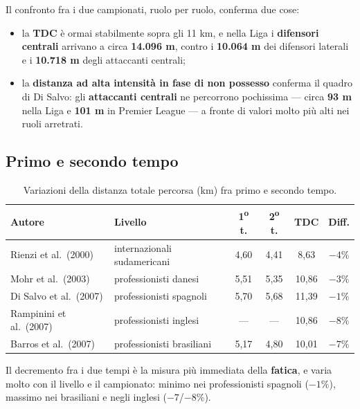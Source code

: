 Il confronto fra i due campionati, ruolo per ruolo, conferma due cose:
\begin{itemize}
  \item la \textbf{TDC} è ormai stabilmente sopra gli 11 km, e nella Liga i \textbf{difensori
    centrali} arrivano a circa \textbf{14.096 m}, contro i \textbf{10.064 m} dei difensori
    laterali e i \textbf{10.718 m} degli attaccanti centrali;
  \item la \textbf{distanza ad alta intensità in fase di non possesso} conferma il quadro di Di
    Salvo: gli \textbf{attaccanti centrali} ne percorrono pochissima --- circa \textbf{93 m} nella
    Liga e \textbf{101 m} in Premier League --- a fronte di valori molto più alti nei ruoli
    arretrati.
\end{itemize}

\subsection{Primo e secondo tempo}

\begin{table}[htbp]
  \centering
  \small
  \renewcommand{\arraystretch}{1.3}
  \begin{tabularx}{\textwidth}{|X|X|c|c|c|c|}
    \hline
    \textbf{Autore} & \textbf{Livello} & \textbf{1\textsuperscript{o} t.} &
      \textbf{2\textsuperscript{o} t.} & \textbf{TDC} & \textbf{Diff.} \\
    \hline
    Rienzi et al.\ (2000) & internazionali sudamericani & 4,60 & 4,41 & 8,63 & $-4\%$ \\
    \hline
    Mohr et al.\ (2003) & professionisti danesi & 5,51 & 5,35 & 10,86 & $-3\%$ \\
    \hline
    Di Salvo et al.\ (2007) & professionisti spagnoli & 5,70 & 5,68 & 11,39 & $-1\%$ \\
    \hline
    Rampinini et al.\ (2007) & professionisti inglesi & --- & --- & 10,86 & $-8\%$ \\
    \hline
    Barros et al.\ (2007) & professionisti brasiliani & 5,17 & 4,80 & 10,01 & $-7\%$ \\
    \hline
  \end{tabularx}
  \caption*{Variazioni della distanza totale percorsa (km) fra primo e secondo tempo.}
\end{table}

Il decremento fra i due tempi è la misura più immediata della \textbf{fatica}, e varia molto con il
livello e il campionato: minimo nei professionisti spagnoli ($-1\%$), massimo nei brasiliani e negli
inglesi ($-7$/$-8\%$).

